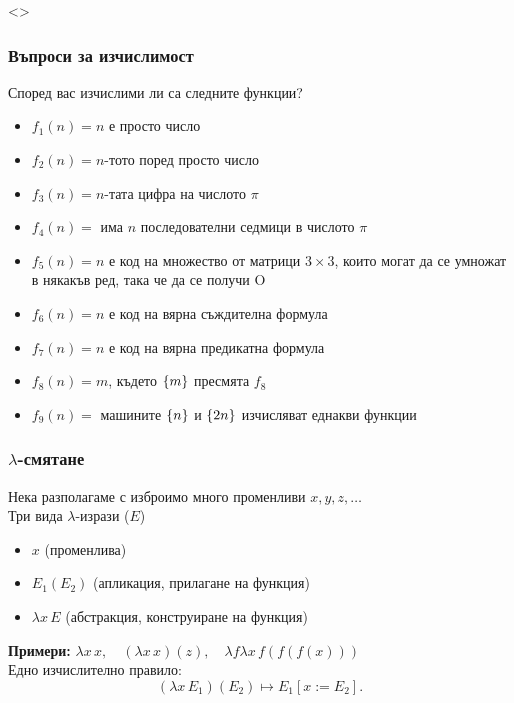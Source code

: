 \documentclass[alsotrans,beameroptions={aspectratio=169}]{beamerswitch}
\begin{document}
\begin{frame}<>
  \frametitle{Въпроси за изчислимост}

  Според вас изчислими ли са следните функции?
  \begin{itemize}[<+->]
  \item $f_1(n) = n$ е просто число
  \item $f_2(n) = n$-тото поред просто число
  \item $f_3(n) = n$-тата цифра на числото $\pi$
  \item $f_4(n) = $ има $n$ последователни седмици в числото $\pi$
  \item $f_5(n) = n$ е код на множество от матрици $3 \times 3$, които могат да се умножат в някакъв ред, така че да се получи O
  \item $f_6(n) = n$ е код на вярна съждителна формула
  \item $f_7(n) = n$ е код на вярна предикатна формула
  \item $f_8(n) = m$, където $\{m\}$ пресмята $f_8$
  \item $f_9(n) = $ машините $\{n\}$ и $\{2n\}$ изчисляват еднакви функции
  \end{itemize}
\end{frame}

\begin{frame}
  \frametitle{$\lambda$-смятане}

  Нека разполагаме с изброимо много променливи $x,y,z,\ldots$\\[2ex]
  Три вида $\lambda$-изрази ($E$)
  \begin{itemize}
  \item $x$ (променлива)
  \item $E_1(E_2)$ (апликация, прилагане на функция)
  \item $\lambda x \, E$ (абстракция, конструиране на функция)
  \end{itemize}
  \vspace{1em}
  \textbf{Примери:} $\lambda x\, x, \quad (\lambda x\, x)(z), \quad \lambda f\lambda x\, f(f(f(x)))$\\[2ex]
  \pause
  Едно изчислително правило:
  \begin{equation*}
    (\lambda x\,E_1)(E_2) \mapsto E_1[x := E_2].
  \end{equation*}
\end{frame}
\end{document}

